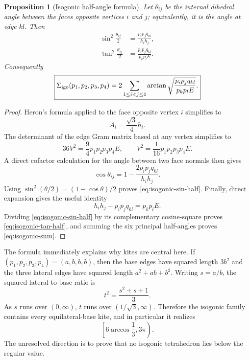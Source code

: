 \documentclass[11pt,a4paper]{article}
\newtheorem{proposition}[theorem]{Proposition}
\theoremstyle{definition}
\theoremstyle{remark}
\begin{document}
\begin{proposition}[Isogonic half-angle formula]
\label{prop:isogonic-formula}
Let $\theta_{ij}$ be the internal dihedral angle between the faces opposite
vertices $i$ and $j$; equivalently, it is the angle at edge $kl$.  Then
\begin{align}
 \sin^2\frac{\theta_{ij}}2
 &=\frac{p_i p_j q_{kl}}{h_i h_j},
 \label{eq:isogonic-sin-half}\\
 \tan^2\frac{\theta_{ij}}2
 &=\frac{p_i p_j q_{kl}}{p_kp_l E}.
 \label{eq:isogonic-tan-half}
\end{align}
Consequently
\begin{equation}\label{eq:isogonic-sum}
 \boxed{
 \Sigma_{\rm igo}(p_1,p_2,p_3,p_4)
 =2\sum_{1\leq i<j\leq4}
 \arctan\sqrt{\frac{p_i p_j q_{kl}}{p_kp_lE}} .
 }
\end{equation}
\end{proposition}

\begin{proof}
Heron's formula applied to the face opposite vertex $i$ simplifies to
\begin{equation}\label{eq:isogonic-face-area}
 A_i=\frac{\sqrt3}{4}h_i.
\end{equation}
The determinant of the edge Gram matrix based at any vertex simplifies to
\begin{equation}\label{eq:isogonic-volume}
 36V^2=\frac94p_1p_2p_3p_4E,
 \qquad
 V^2=\frac1{16}p_1p_2p_3p_4E.
\end{equation}
A direct cofactor calculation for the angle between two face normals then
gives
\begin{equation}\label{eq:isogonic-cos}
 \cos\theta_{ij}
 =1-\frac{2p_ip_jq_{kl}}{h_ih_j}.
\end{equation}
Using $\sin^2(\theta/2)=(1-\cos\theta)/2$ proves
\eqref{eq:isogonic-sin-half}.  Finally, direct expansion gives the useful
identity
\begin{equation}\label{eq:isogonic-identity}
 h_ih_j-p_ip_jq_{kl}=p_kp_lE.
\end{equation}
Dividing \eqref{eq:isogonic-sin-half} by its complementary cosine-square
proves \eqref{eq:isogonic-tan-half}, and summing the six principal
half-angles proves \eqref{eq:isogonic-sum}.
\end{proof}

The formula immediately explains why kites are central here.  If
$(p_1,p_2,p_3,p_4)=(a,b,b,b)$, then the base edges have squared length
$3b^2$ and the three lateral edges have squared length $a^2+ab+b^2$.
Writing $s=a/b$, the squared lateral-to-base ratio is
\begin{equation}\label{eq:isogonic-kite-ratio}
 t^2=\frac{s^2+s+1}{3}.
\end{equation}
As $s$ runs over $(0,\infty)$, $t$ runs over $(1/\sqrt3,\infty)$.
Therefore the isogonic family contains every equilateral-base kite, and in
particular it realizes
\begin{equation}\label{eq:isogonic-known-half}
 \left[6\arccos\frac13,3\pi\right).
\end{equation}
The unresolved direction is to prove that no isogonic tetrahedron lies below
the regular value.
\end{document}
